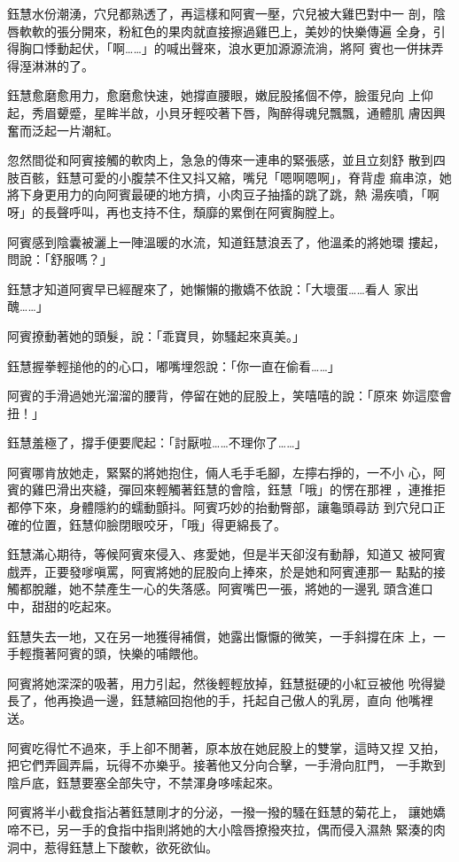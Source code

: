 鈺慧水份潮湧，穴兒都熟透了，再這樣和阿賓一壓，穴兒被大雞巴對中一
剖，陰唇軟軟的張分開來，粉紅色的果肉就直接擦過雞巴上，美妙的快樂傳遍
全身，引得胸口悸動起伏，「啊……」的喊出聲來，浪水更加源源流淌，將阿
賓也一併抹弄得溼淋淋的了。

鈺慧愈磨愈用力，愈磨愈快速，她撐直腰眼，嫩屁股搖個不停，臉蛋兒向
上仰起，秀眉顰蹙，星眸半啟，小貝牙輕咬著下唇，陶醉得魂兒飄飄，通體肌
膚因興奮而泛起一片潮紅。

忽然間從和阿賓接觸的軟肉上，急急的傳來一連串的緊張感，並且立刻舒
散到四肢百骸，鈺慧可愛的小腹禁不住又抖又縮，嘴兒「嗯啊嗯啊」，脊背虛
痲串涼，她將下身更用力的向阿賓最硬的地方擠，小肉豆子抽搐的跳了跳，熱
湯疾噴，「啊呀」的長聲呼叫，再也支持不住，頹靡的累倒在阿賓胸膛上。

阿賓感到陰囊被灑上一陣溫暖的水流，知道鈺慧浪丟了，他溫柔的將她環
摟起，問說：「舒服嗎？」

鈺慧才知道阿賓早已經醒來了，她懶懶的撒嬌不依說：「大壞蛋……看人
家出醜……」

阿賓撩動著她的頭髮，說：「乖寶貝，妳騷起來真美。」

鈺慧握拳輕搥他的的心口，嘟嘴埋怨說：「你一直在偷看……」

阿賓的手滑過她光溜溜的腰背，停留在她的屁股上，笑嘻嘻的說：「原來
妳這麼會扭！」

鈺慧羞極了，撐手便要爬起：「討厭啦……不理你了……」

阿賓哪肯放她走，緊緊的將她抱住，倆人毛手毛腳，左擰右掙的，一不小
心，阿賓的雞巴滑出夾縫，彈回來輕觸著鈺慧的會陰，鈺慧「哦」的愣在那裡
，連推拒都停下來，身體隱約的蠕動顫抖。阿賓巧妙的抬動臀部，讓龜頭尋訪
到穴兒口正確的位置，鈺慧仰臉閉眼咬牙，「哦」得更綿長了。

鈺慧滿心期待，等候阿賓來侵入、疼愛她，但是半天卻沒有動靜，知道又
被阿賓戲弄，正要發嗲嗔罵，阿賓將她的屁股向上捧來，於是她和阿賓連那一
點點的接觸都脫離，她不禁產生一心的失落感。阿賓嘴巴一張，將她的一邊乳
頭含進口中，甜甜的吃起來。

鈺慧失去一地，又在另一地獲得補償，她露出懨懨的微笑，一手斜撐在床
上，一手輕攬著阿賓的頭，快樂的哺餵他。

阿賓將她深深的吸著，用力引起，然後輕輕放掉，鈺慧挺硬的小紅豆被他
吮得變長了，他再換過一邊，鈺慧縮回抱他的手，托起自己傲人的乳房，直向
他嘴裡送。

阿賓吃得忙不過來，手上卻不閒著，原本放在她屁股上的雙掌，這時又捏
又拍，把它們弄圓弄扁，玩得不亦樂乎。接著他又分向合擊，一手滑向肛門，
一手欺到陰戶底，鈺慧要塞全部失守，不禁渾身哆嗦起來。

阿賓將半小截食指沾著鈺慧剛才的分泌，一撥一撥的騷在鈺慧的菊花上，
讓她嬌啼不已，另一手的食指中指則將她的大小陰唇撩撥夾拉，偶而侵入濕熱
緊湊的肉洞中，惹得鈺慧上下酸軟，欲死欲仙。

